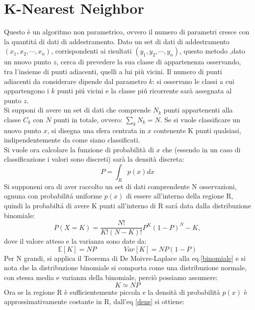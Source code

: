 \documentclass[a4paper,12pt,oneside]{book}
\begin{document}
\section{K-Nearest Neighbor}\label{knn}
Questo \`e un algoritmo non parametrico, ovvero il numero di parametri cresce con la quantit\'{a} di dati di addestramento.
Dato un set di dati di addestramento $(x_1,x_2,\cdots,x_n)$, corrispondenti ai risultati $(y_1,y_2,\cdots,y_n)$, questo metodo ,dato un nuovo punto $z$, cerca di prevedere la sua classe di appartenenza osservando, tra l'insieme di punti adiacenti, quelli a lui pi\`{u} vicini. Il numero di punti adiacenti da considerare dipende dal parametro $k$: si osservano le classi a cui appartengono i $k$ punti pi\'{u} vicini e la classe pi\'{u} ricorrente sar\`{a} assegnata al punto $z$.\\ 
Si supponi di avere un set di dati che comprende $N_k$ punti appartenenti alla classe $C_k$ con $N$ punti in totale, ovvero: $\sum_{k}N_k = N$. Se si vuole classificare un nuovo punto $x$, si disegna una sfera centrata in $x$ contenente  K punti qualsiasi, indipendentemente da come siano classificati.\\
Si vuole ora calcolare la funzione di probabilit\`{a} di $x$ che (essendo in un caso di classificazione i valori sono discreti) sar\`{a} la densit\`{a} discreta:
\begin{equation}\label{dens}
P=\int_R p(x) dx
\end{equation}
Si supponeni ora di aver raccolto un set di dati comprendente N osservazioni, ognuna con probabilit\'{a} uniforme $p(x)$ di essere all'interno della regione R, quindi la probabilt\'{a} di avere K punti all'interno di R sar\'{a} data dalla distribuzione binomiale:
\begin{equation} \label{binomiale}
P(X=K)=\frac{N!}{K!(N-K)!}P^K (1-P)^N-K,
\end{equation} 
dove il valore atteso e la varianza sono date da:
\begin{equation}
\mathbb{E}[K]=NP \qquad \qquad Var[K]=NP(1-P)
\end{equation}
Per N grandi, si applica il Teorema di De Moivre-Laplace alla eq.\ref{binomiale} e si nota che la distribuzione binomiale si comporta come una distribuzione normale, con stessa media e varianza della binomiale, perci\`{o} possiamo assumere:
\begin{equation} \label{eqbin1}
K\simeq NP
\end{equation}
Ora se la regione R \`{e} sufficientemente piccola e la densit\`{a} di probabilit\`{a} $p(x)$ \`{e} approssimativamente costante in R, dall'eq \ref{dens} si ottiene:
\end{document}
